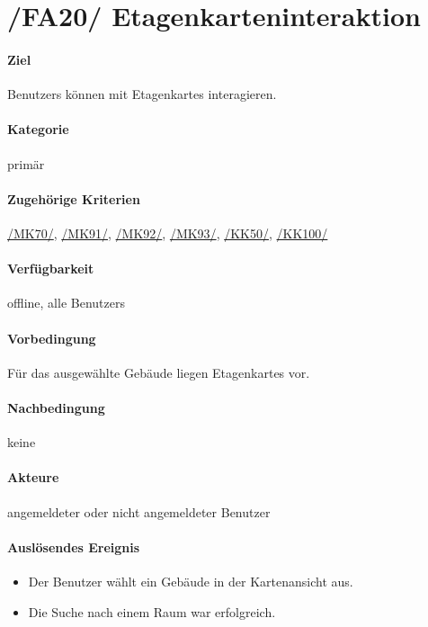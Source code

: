 \section[Etagenkarteninteraktion]{/FA20/ Etagenkarteninteraktion}
\label{/FA20/}
\paragraph{Ziel}
\Glspl{Benutzer} können mit \Glspl{Etagenkarte} interagieren.
\paragraph{Kategorie}
primär
\paragraph{Zugehörige Kriterien}
\hyperref[/MK70/]{/MK70/}, \hyperref[/MK91/]{/MK91/}, \hyperref[/MK92/]{/MK92/}, \hyperref[/MK93/]{/MK93/}, \hyperref[/KK50/]{/KK50/}, \hyperref[/KK100/]{/KK100/}
\paragraph{Verfügbarkeit}
\gls{offline}, alle \Glspl{Benutzer}
\paragraph{Vorbedingung}
Für das ausgewählte Gebäude liegen \Glspl{Etagenkarte} vor.
\paragraph{Nachbedingung}
keine
\paragraph{Akteure}
angemeldeter oder nicht angemeldeter \Gls{Benutzer}
\paragraph{Auslösendes Ereignis}
\begin{itemize}
    \item Der \Gls{Benutzer} wählt ein Gebäude in der \Gls{Kartenansicht} aus.
    \item Die Suche nach einem Raum war erfolgreich.
\end{itemize}
 

